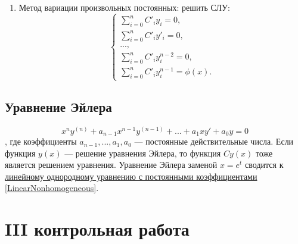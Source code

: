 \documentclass[a5paper,10pt]{article}
\begin{document}
\begin{enumerate}
\begin{enumerate}
						\item Метод вариации произвольных постоянных: решить СЛУ:
							\begin{equation*}
								\begin{cases}
									\sum\limits^n_{i=0}C\prime_i y_i = 0,\\
									\sum\limits^n_{i=0}C\prime_i y\prime_i = 0,\\
									...,\\
									\sum\limits^n_{i=0}C\prime_i y^{n-2}_i = 0,\\
									\sum\limits^n_{i=0}C\prime_i y^{n-1}_i = \phi(x).
								\end{cases}
							\end{equation*}
					\end{enumerate}
			\end{enumerate}

		\subsection{Уравнение Эйлера}
			$$ x^ny^{(n)} + a_{n-1}x^{n-1}y^{(n-1)} + ... + a_1xy\prime + a_0y = 0 $$, где коэффициенты $ a_{n-1},...,a_1,a_0 $ — постоянные действительные числа.
			Если функция $y(x)$ — решение уравнения Эйлера, то функция $Cy(x)$ тоже является решением уравнения.
			Уравнение Эйлера заменой $ x = e^t $ сводится к \underline{линейному однородному уравнению с постоянными коэффициентами} \ref{LinearNonhomogeneous}.

		\newpage

	\section{III контрольная работа}
\end{document}
